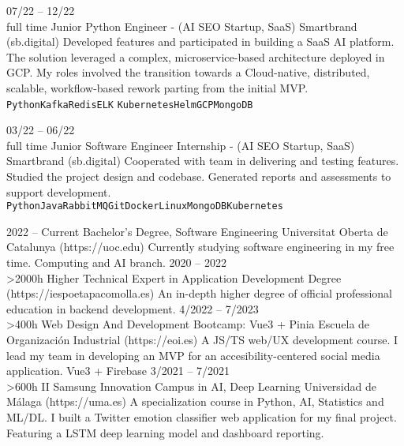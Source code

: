 \documentclass[10pt]{developercv} %
\begin{document}
\begin{entrylist}
	\entry
		{07/22 -- 12/22\\\footnotesize{full time}}
		{Junior Python Engineer - (AI SEO Startup, SaaS)}
		{Smartbrand (sb.digital)}
		{Developed features and participated in building a SaaS AI platform. The solution leveraged a complex, microservice-based architecture deployed in GCP. My roles involved the transition towards a Cloud-native, distributed, scalable, workflow-based rework parting from the initial MVP.\\
		\texttt{Python}\slashsep\texttt{Kafka}\slashsep\texttt{Redis}\slashsep\texttt{ELK}
		\slashsep\texttt{Kubernetes}\slashsep\texttt{Helm}\slashsep\texttt{GCP}\slashsep\texttt{MongoDB}}
	
	\entry
		{03/22 -- 06/22\\\footnotesize{full time}}
		{Junior Software Engineer Internship - (AI SEO Startup, SaaS)}
		{Smartbrand (sb.digital)}
		{Cooperated with team in delivering and testing features. Studied the project design and codebase. Generated reports and assessments to support development. \\ 
		\texttt{Python}\slashsep\texttt{Java}\slashsep\texttt{RabbitMQ}\slashsep\texttt{Git}\slashsep\texttt{Docker}\slashsep\texttt{Linux}\slashsep\texttt{MongoDB}\slashsep\texttt{Kubernetes}}
\end{entrylist}



\begin{entrylist}
	\entry
		{2022 -- Current}
		{Bachelor's Degree, Software Engineering}
		{Universitat Oberta de Catalunya (https://uoc.edu)}
		{Currently studying software engineering in my free time. Computing and AI branch.}
	\entry
		{2020 -- 2022\\\footnotesize{>2000h}}
		{Higher Technical Expert in Application Development Degree}
		{(https://iespoetapacomolla.es)}
		{An in-depth higher degree of official professional education in backend development.}
	\entry
	{4/2022 -- 7/2023\\\footnotesize{>400h}}
	{Web Design And Development Bootcamp: Vue3 + Pinia}
	{Escuela de Organización Industrial (https://eoi.es)}
	{A JS/TS web/UX development course. I lead my team in developing an MVP for an accesibility-centered social media application. Vue3 + Firebase}
	\entry
		{3/2021 -- 7/2021\\\footnotesize{>600h}}
		{II Samsung Innovation Campus in AI, Deep Learning}
		{Universidad de Málaga (https://uma.es)}
		{A specialization course in Python, AI, Statistics and ML/DL. I built a Twitter emotion classifier web application for my final project. Featuring a LSTM deep learning model and dashboard reporting.}
\end{entrylist}
\end{document}
